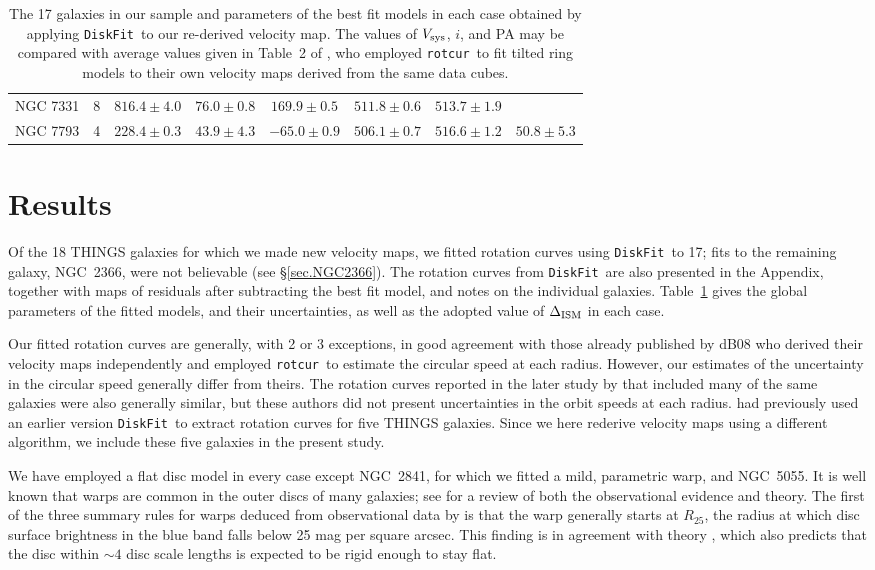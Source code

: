 \documentclass[letterpaper,fleqn,usenatbib]{mnras}
\def\eg{{\it e.g.}}
\def\DFt{{\tt DiskFit}}
\def\rtc{{\tt rotcur}}
\begin{document}
\begin{table}
\begin{tabular}{@{}lccccccc}
NGC 7331 & 8 & $816.4 \pm 4.0$ & $76.0 \pm 0.8$ & $169.9 \pm 0.5$ 
& $511.8 \pm 0.6$ & $513.7 \pm 1.9$  \\
NGC 7793 & 4 & $228.4 \pm 0.3$ & $43.9 \pm 4.3$ & $-65.0 \pm 0.9$ 
& $506.1 \pm 0.7$ & $516.6 \pm 1.2$ & $50.8 \pm 5.3$  \\
\end{tabular}
\caption{The 17 galaxies in our sample and parameters of the best fit
  models in each case obtained by applying \DFt\ to our re-derived
  velocity map.  The values of $V_{\rm sys}$, $i$, and PA may be
  compared with average values given in Table~2 of \citet{deB08}, who
  employed \rtc\ to fit tilted ring models to their own velocity maps
  derived from the same data cubes.}
\label{tab.summary}
\end{table}

\section{Results}
\label{sec.results}
Of the 18 THINGS galaxies for which we made new velocity maps, we
fitted rotation curves using \DFt\ to 17; fits to the remaining
galaxy, NGC~2366, were not believable (see \S\ref{sec.NGC2366}).  The
rotation curves from \DFt\ are also presented in the Appendix,
together with maps of residuals after subtracting the best fit model,
and notes on the individual galaxies.  Table~\ref{tab.summary} gives
the global parameters of the fitted models, and their uncertainties,
as well as the adopted value of $\Delta_{\rm ISM}$ in each case.

Our fitted rotation curves are generally, with 2 or 3 exceptions, in
good agreement with those already published by dB08 who derived their
velocity maps independently and employed \rtc\ to estimate the
circular speed at each radius.  However, our estimates of the
uncertainty in the circular speed generally differ from theirs.  The
rotation curves reported in the later study by \citet{Po16} that
included many of the same galaxies were also generally similar, but
these authors did not present uncertainties in the orbit speeds at
each radius.  \citet{SZS10} had previously used an earlier version
\DFt\ to extract rotation curves for five THINGS galaxies.  Since we
here rederive velocity maps using a different algorithm, we include
these five galaxies in the present study.

We have employed a flat disc model in every case except NGC~2841, for
which we fitted a mild, parametric warp, and NGC~5055.  It is well
known that warps are common in the outer discs of many galaxies; see
\citet{Sell13} for a review of both the observational evidence and
theory.  The first of the three summary rules for warps deduced from
observational data by \citet{Brig90} is that the warp generally starts
at $R_{25}$, the radius at which disc surface brightness in the blue
band falls below 25 mag per square arcsec.  This finding is in
agreement with theory \citep[\eg][]{SS06}, which also predicts that
the disc within $\sim 4$ disc scale lengths is expected to be rigid
enough to stay flat.
\end{document}
